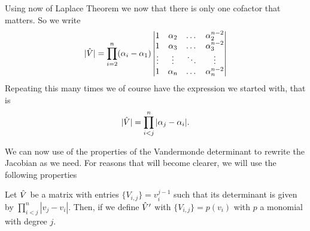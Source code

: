 Using now of Laplace Theorem we now that there is only one cofactor that matters. So we write
\[
|\hat V| =
\prod_{i=2}^n (\alpha_i - \alpha_1)
\begin{vmatrix}
	1 & \alpha_2 & \dots & \alpha_2^{n-2} \\
	1 & \alpha_3 & \dots & \alpha_3^{n-2} \\
	\vdots & \vdots & \ddots & \vdots \\
	1 & \alpha_n & \dots & \alpha_n^{n-2}
\end{vmatrix}
\]
Repeating this many times we of course have the expression we started with, that is
\[
|\hat V| = \prod_{i<j}^n |\alpha_j - \alpha_i|.
\]

We can now use of the properties of the Vandermonde determinant to rewrite the Jacobian as we need. For reasons that will become clearer, we will use the following properties

\begin{claim}
	Let $\hat V$ be a matrix with entries $\{V_{i,j}\} = v_i^{j-1}$ such that its determinant is given by $\prod_{i < j}^{n} |v_j - v_i|$. Then, if we define $\hat V'$ with $\{V_{i,j}\} = p(v_i)$ with $p$ a monomial with degree $j$.
	\label{Prop: Vandermonde polynomial}
\end{claim} 